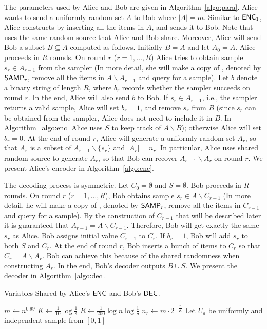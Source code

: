 The parameters used by Alice and Bob are given in Algorithm~\ref{algo:para}.
Alice wants to send a uniformly random set $A$ to Bob where $|A|=m$. Similar to $\textsf{ENC}_1$, Alice constructs \samp by inserting all the items in $A$, and sends it to Bob. Note that \samp uses the same random source that Alice and Bob share. Moreover, Alice will send Bob a subset $B\subseteq A$ computed as follows. Initially $B=A$ and let $A_0=A$. Alice proceeds in $R$ rounds. On round $r$ ($r=1,\ldots, R$) Alice tries to obtain sample $s_r\in A_{r-1}$ from the sampler 
(In more detail, she will make a copy of \samp, denoted by $\textsf{SAMP}_r$, remove all the items in $A\backslash A_{r-1}$ and query for a sample). 
Let $b$ denote a binary string of length $R$, where $b_r$ records whether the sampler succeeds on round $r$. In the end, Alice will also send $b$ to Bob. If $s_r\in A_{r-1}$, i.e., the sampler returns a valid sample, Alice will set $b_r=1$, and remove $s_r$ from $B$ (since $s_r$ can be obtained from the sampler, Alice does not need to include it in $B$. In Algorithm~\ref{algo:enc} Alice uses $S$ to keep track of $A\backslash B$); otherwise Alice will set $b_r=0$.
At the end of round $r$, Alice will generate a uniformly random set $A_r$, so that $A_r$ is a subset of $A_{r-1}\backslash \{s_r\}$ and $|A_r|=n_r$. 
In particular, Alice uses shared random source to generate $A_r$, so that Bob can recover $A_{r-1}\backslash A_r$ on round $r$. 
We present Alice's encoder in Algorithm~\ref{algo:enc}.

The decoding process is symmetric. Let $C_0=\emptyset$ and $S=\emptyset$. Bob proceeds in $R$ rounds. 
On round $r$ ($r=1,\ldots,R$), Bob obtains sample $s_r\in A\backslash C_{r-1}$ (In more detail, he will make a copy of \samp, denoted by $\textsf{SAMP}_r$, remove all the items in $C_{r-1}$ and query for a sample). 
By the construction of $C_{r-1}$ that will be described later it is guaranteed that $A_{r-1}=A\backslash C_{r-1}$. 
Therefore, Bob will get exactly the same $s_r$ as Alice. 
Bob assigns initial value $C_{r-1}$ to $C_r$.
If $b_r=1$, Bob will add $s_r$ to both $S$ and $C_r$.
At the end of round $r$, Bob inserts a bunch of items to $C_r$ so that $C_r=A\backslash A_r$. Bob can achieve this because of the shared randomness when constructing $A_r$.
In the end, Bob's decoder outputs $B\cup S$.
We present the decoder in Algorithm~\ref{algo:dec}.

\begin{algorithm}[H] 
  \caption{Variables Shared by Alice's $\textsf{ENC}$ and Bob's $\textsf{DEC}$.} \label{algo:para}
  \begin{algorithmic}[1] 
    \State $m\leftarrow n^{0.99}$
    \State $K\leftarrow \frac{1}{10}\log \frac{1}{\delta}$
    \State $R\leftarrow \frac{1}{200}\log n \log \frac{1}{\delta}$
      \State $n_r\leftarrow m \cdot 2^{-\frac{r}{K}}$ 
    \EndFor
      \State Let $U_a$ be uniformly and independent sample from $[0,1]$ 
    \EndFor
  \end{algorithmic}
\end{algorithm}

